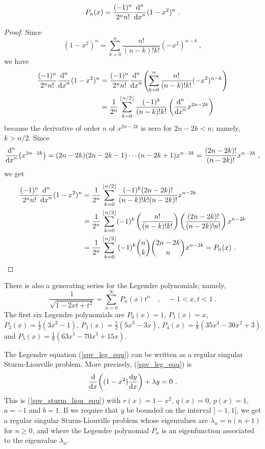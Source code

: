 \begin{prop}
\[
P_n(x) = \frac{(-1)^n}{2^n n!} \dfdxn{(1-x^2)^n}{x}{n} \ .
\]
\end{prop}

\begin{proof}
Since
\[
(1-x^2)^n = \sum_{k=0}^n \frac{n!}{(n-k)!k!} (-x^2)^{n-k} \ ,
\]
we have
\begin{align*}
\frac{(-1)^n}{2^n n!} \dfdxn{(1-x^2)^n}{x}{n}
&= \frac{(-1)^n}{2^n n!}
\dfdxn{ \left( \sum_{k=0}^n \frac{n!}{(n-k)!k!} (-x^2)^{n-k} \right)}{x}{n} \\
&= \frac{1}{2^n}\sum_{k=0}^{\intpt{n/2}} \frac{(-1)^k}{(n-k)!k!}
\left( \dfdxn{x^{2n-2k}}{x}{n} \right)
\end{align*}
because the derivative of order $n$ of $x^{2n-2k}$ is zero for 
$2n-2k<n$; namely, $k > n/2$.  Since
\[
\dfdxn{\left(x^{2n-2k}\right)}{x}{n} =
(2n-2k)(2n-2k-1) \cdots (n-2k+1) x^{n-2k}
= \frac{(2n-2k)!}{(n-2k)!} x^{n-2k} \ ,
\]
we get
\begin{align*}
\frac{(-1)^n}{2^n n!} \dfdxn{(1-x^2)^n}{x}{n}
&= \frac{1}{2^n}\sum_{k=0}^{\intpt{n/2}} \frac{(-1)^k (2n-2k)!}{(n-k)!k!(n-2k)!}
x^{n-2k} \\
&= \frac{1}{2^n}\sum_{k=0}^{\intpt{n/2}} (-1)^k
\left(\frac{n!}{(n-k)!k!}\right)
\left(\frac{(2n-2k)!}{(n-2k)!n!}\right) x^{n-2k} \\
&= \frac{1}{2^n} \sum_{k=0}^{\intpt{n/2}} \, (-1)^k \binom{n}{k}
\binom{2n-2k}{n} x^{n-2k} = P_n(x) \ .  \qedhere
\end{align*}
\end{proof}

There is also a generating series for the Legendre polynomials;
namely,
\[
\frac{1}{\sqrt{1-2xt +t^2}} = \sum_{n=0}^{\infty} \, P_n(x) t^n \quad ,
\quad -1 < x,t < 1 \ .
\]
The first six Legendre polynomials are
$\displaystyle P_0(x) = 1$, $\displaystyle P_1(x) = x$,
$\displaystyle P_2(x) = \frac{1}{2}(3x^2-1)$,
$\displaystyle P_3(x) = \frac{1}{2} (5x^3 - 3 x)$,
$\displaystyle P_4(x) = \frac{1}{8}(35x^4 - 30x^2 + 3)$ and
$\displaystyle P_5(x) = \frac{1}{8} (63x^5 -70x^3 + 15x)$.

The Legendre equation (\ref{spv_leg_equ}) can be written as a regular
singular Sturm-Liouville problem.  More precisely, (\ref{spv_leg_equ}) is 
\[
\dfdx{ \left( (1-x^2) \dydx{y}{x}\right)}{x} + \lambda y = 0 \ .
\]
This is (\ref{spv_sturm_liou_equ}) with
$\displaystyle r(x) = 1 -x^2$, $q(x)=0$,
$p(x) =1$, $a=-1$ and $b=1$.  If we require that $y$ be bounded on the
interval $]-1,1[$, we get a regular singular Sturm-Liouville problem
whose eigenvalues are $\lambda_n = n(n+1)$ for $n \geq 0$, and where
the Legendre polynomial $P_n$ is an eigenfunction associated to the
eigenvalue $\lambda_n$.

